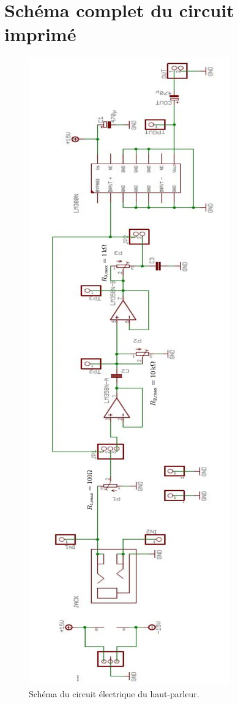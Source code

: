 \chapter{Schéma complet du circuit imprimé}
\label{circuitcomplet}	

\begin{figure}[h!]
\begin{center}
\includegraphics[scale=0.5]{img/circuitcomplet} 
\end{center}
\caption{Schéma du circuit électrique du haut-parleur.}
\label{figcircuitcomplet}
\end{figure}
